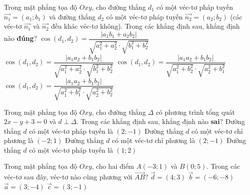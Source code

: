 \begin{ex}%
	Trong mặt phẳng tọa độ $Oxy$, cho đường thẳng $d_1$ có một véc-tơ pháp tuyến $\vec{n_1}=\left(a_1;b_1\right)$ và đường thẳng $d_2$ có một véc-tơ pháp tuyến $\vec{n_2}=\left(a_2;b_2\right)$ (các véc-tơ $\vec{n_1}$ và $\vec{n_2}$ đều khác véc-tơ không). Trong các khẳng định sau, khẳng định nào \textbf{đúng}?
	\choice
	{$\cos\left(d_1, d_2\right)=\dfrac{\left|a_1b_1 + a_2b_2\right|}{\sqrt{a_1^2 + a_2^2}\cdot\sqrt{b_1^2 + b_2^2}}$}
	{$\cos\left(d_1, d_2\right)=\dfrac{\left|a_1a_2 + b_1b_2\right|}{\sqrt{a_1^2 + a_2^2}\cdot\sqrt{b_1^2 + b_2^2}}$}
	{$\cos\left(d_1, d_2\right)=\dfrac{\left|a_1a_2 + b_1b_2\right|}{\sqrt{a_1^2 + b_2^2}\cdot\sqrt{a_2^2 + b_1^2}}$}
	{\True$\cos\left(d_1, d_2\right)=\dfrac{\left|a_1a_2 + b_1b_2\right|}{\sqrt{a_1^2 + b_1^2}\cdot\sqrt{a_2^2 + b_2^2}}$}
\end{ex}

\begin{ex}%
	Trong mặt phẳng tọa độ $Oxy$, cho đường thẳng $\Delta$ có phương trình tổng quát $2x-y+3=0$ và $d\perp\Delta$. Trong các khẳng định sau, khẳng định nào \textbf{sai}?
	\choice
	{\True Đường thẳng $d$ có một véc-tơ pháp tuyến là $(2;-1)$}
	{Đường thẳng $d$ có một véc-tơ chỉ phương là $(-2;1)$}
	{Đường thẳng $d$ có một véc-tơ chỉ phương là $(2;-1)$}
	{Đường thẳng $d$ có một véc-tơ pháp tuyến là $(1;2)$}
\end{ex}

\begin{ex}%
	Trong mặt phẳng tọa độ $Oxy$, cho hai điểm $A(-3;1)$ và $B(0;5)$. Trong các véc-tơ sau đây, véc-tơ nào cùng phương với $\vec{AB}$?
	\choice
	{$\vec{d}=(4;3)$}
	{\True$\vec{b}=(-6;-8)$}
	{$\vec{a}=(3;-4)$}
	{$\vec{c}=(3;-1)$}
\end{ex}


